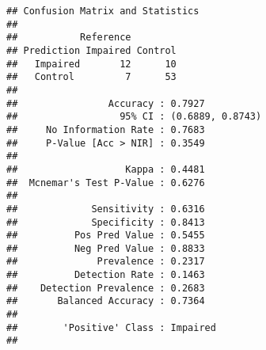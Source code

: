 \documentclass[]{article}
\newenvironment{Shaded}{\begin{snugshade}}{\end{snugshade}}
\newcommand{\KeywordTok}[1]{\textcolor[rgb]{0.13,0.29,0.53}{\textbf{#1}}}
\newcommand{\DataTypeTok}[1]{\textcolor[rgb]{0.13,0.29,0.53}{#1}}
\newcommand{\StringTok}[1]{\textcolor[rgb]{0.31,0.60,0.02}{#1}}
\newcommand{\CommentTok}[1]{\textcolor[rgb]{0.56,0.35,0.01}{\textit{#1}}}
\newcommand{\OperatorTok}[1]{\textcolor[rgb]{0.81,0.36,0.00}{\textbf{#1}}}
\newcommand{\NormalTok}[1]{#1}
\begin{document}
\begin{Shaded}
\end{Shaded}

\begin{verbatim}
## Confusion Matrix and Statistics
## 
##           Reference
## Prediction Impaired Control
##   Impaired       12      10
##   Control         7      53
##                                           
##                Accuracy : 0.7927          
##                  95% CI : (0.6889, 0.8743)
##     No Information Rate : 0.7683          
##     P-Value [Acc > NIR] : 0.3549          
##                                           
##                   Kappa : 0.4481          
##  Mcnemar's Test P-Value : 0.6276          
##                                           
##             Sensitivity : 0.6316          
##             Specificity : 0.8413          
##          Pos Pred Value : 0.5455          
##          Neg Pred Value : 0.8833          
##              Prevalence : 0.2317          
##          Detection Rate : 0.1463          
##    Detection Prevalence : 0.2683          
##       Balanced Accuracy : 0.7364          
##                                           
##        'Positive' Class : Impaired        
## 
\end{verbatim}

\begin{Shaded}
\end{Shaded}
\end{document}
